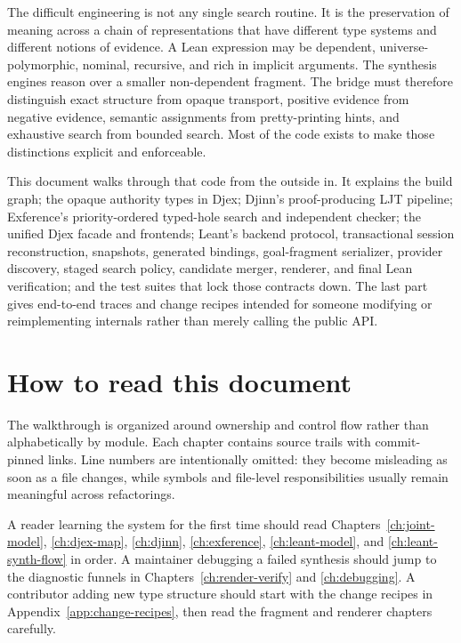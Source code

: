 \documentclass[10pt,letterpaper,oneside]{report}
\newcommand{\code}[1]{\texttt{\detokenize{#1}}}
\begin{document}
The difficult engineering is not any single search routine. It is the preservation of meaning across a chain of representations that have different type systems and different notions of evidence. A Lean expression may be dependent, universe-polymorphic, nominal, recursive, and rich in implicit arguments. The synthesis engines reason over a smaller non-dependent fragment. The bridge must therefore distinguish exact structure from opaque transport, positive evidence from negative evidence, semantic assignments from pretty-printing hints, and exhaustive search from bounded search. Most of the code exists to make those distinctions explicit and enforceable.

This document walks through that code from the outside in. It explains the build graph; the opaque authority types in Djex; Djinn's proof-producing LJT pipeline; Exference's priority-ordered typed-hole search and independent checker; the unified Djex facade and frontends; Leant's backend protocol, transactional session reconstruction, snapshots, generated \code{it} bindings, goal-fragment serializer, provider discovery, staged search policy, candidate merger, renderer, and final Lean verification; and the test suites that lock those contracts down. The last part gives end-to-end traces and change recipes intended for someone modifying or reimplementing internals rather than merely calling the public API.

\tableofcontents
\clearpage
{}

\chapter*{How to read this document}

The walkthrough is organized around ownership and control flow rather than alphabetically by module. Each chapter contains source trails with commit-pinned links. Line numbers are intentionally omitted: they become misleading as soon as a file changes, while symbols and file-level responsibilities usually remain meaningful across refactorings.

A reader learning the system for the first time should read Chapters~\ref{ch:joint-model}, \ref{ch:djex-map}, \ref{ch:djinn}, \ref{ch:exference}, \ref{ch:leant-model}, and \ref{ch:leant-synth-flow} in order. A maintainer debugging a failed synthesis should jump to the diagnostic funnels in Chapters~\ref{ch:render-verify} and \ref{ch:debugging}. A contributor adding new type structure should start with the change recipes in Appendix~\ref{app:change-recipes}, then read the fragment and renderer chapters carefully.
\end{document}
